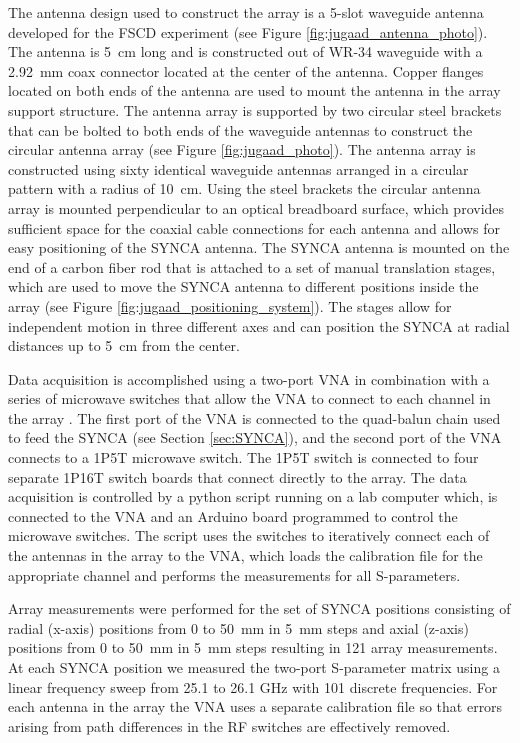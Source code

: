 The antenna design used to construct the array is a 5-slot waveguide antenna developed for the FSCD experiment (see Figure \ref{fig:jugaad_antenna_photo}). The antenna is 5~cm long and is constructed out of WR-34 waveguide with a 2.92~mm coax connector located at the center of the antenna. Copper flanges located on both ends of the antenna are used to mount the antenna in the array support structure. The antenna array is supported by two circular steel brackets that can be bolted to both ends of the waveguide antennas to construct the circular antenna array (see Figure \ref{fig:jugaad_photo}). The antenna array is constructed using sixty identical waveguide antennas arranged in a circular pattern with a radius of 10~cm. Using the steel brackets the circular antenna array is mounted perpendicular to an optical breadboard surface, which provides sufficient space for the coaxial cable connections for each antenna and allows for easy positioning of the SYNCA antenna. The SYNCA antenna is mounted on the end of a carbon fiber rod that is attached to a set of manual translation stages, which are used to move the SYNCA antenna to different positions inside the array (see Figure \ref{fig:jugaad_positioning_system}). The stages allow for independent motion in three different axes and can position the SYNCA at radial distances up to 5~cm from the center.

Data acquisition is accomplished using a two-port VNA in combination with a series of microwave switches that allow the VNA to connect to each channel in the array .  The first port of the VNA is connected to the quad-balun chain used to feed the SYNCA (see Section \ref{sec:SYNCA}), and the second port of the VNA connects to a 1P5T microwave switch. The 1P5T switch is connected to four separate 1P16T switch boards that connect directly to the array. The data acquisition is controlled by a python script running on a lab computer which, is connected to the VNA and an Arduino board programmed to control the microwave switches. The script uses the switches to iteratively connect each of the antennas in the array to the VNA, which loads the calibration file for the appropriate channel and performs the measurements for all S-parameters.

Array measurements were performed for the set of SYNCA positions consisting of radial (x-axis) positions from 0 to 50~mm in 5~mm steps and axial (z-axis) positions from 0 to 50~mm in 5~mm steps resulting in 121 array measurements. At each SYNCA position we measured the two-port S-parameter matrix using a linear frequency sweep from 25.1 to 26.1 GHz with 101 discrete frequencies. For each antenna in the array the VNA uses a separate calibration file so that errors arising from path differences in the RF switches are effectively removed. 

